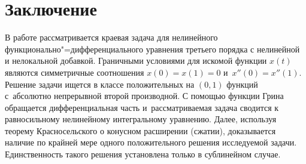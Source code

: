 \documentclass[press]{vestnik}
\begin{document}
\section*{Заключение}
В работе рассматривается краевая задача для нелинейного функционально"=дифференциального уравнения третьего порядка с нелинейной и нелокальной добавкой. Граничными условиями для искомой функции $x(t)$ являются симметричные соотношения $x(0)=x(1)=0$ и~$x''(0)=x''(1)$. Решение задачи ищется в классе положительных на $(0, 1)$ функций с~абсолютно непрерывной второй производной. С помощью функции Грина обращается дифференциальная часть и~рассматриваемая задача сводится к равносильному нелинейному интегральному уравнению. Далее, используя теорему Красносельского о конусном расширении (сжатии), доказывается наличие по крайней мере одного положительного решения исследуемой задачи. Единственность такого решения установлена только в  сублинейном случае.
\end{document}
